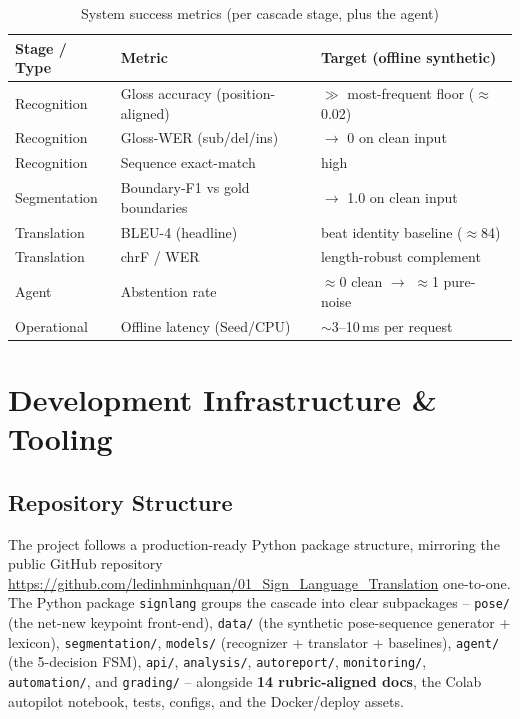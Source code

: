 \documentclass[12pt,a4paper]{article}
\begin{document}
\begin{table}[H]
\centering
\caption{System success metrics (per cascade stage, plus the agent)}
\begin{tabular}{lll}
\toprule
\textbf{Stage / Type} & \textbf{Metric} & \textbf{Target (offline synthetic)} \\
\midrule
Recognition & Gloss accuracy (position-aligned) & $\gg$ most-frequent floor ($\approx$0.02) \\
Recognition & Gloss-WER (sub/del/ins) & $\rightarrow$ 0 on clean input \\
Recognition & Sequence exact-match & high \\
Segmentation & Boundary-F1 vs gold boundaries & $\rightarrow$ 1.0 on clean input \\
Translation & BLEU-4 (headline) & beat identity baseline ($\approx$84) \\
Translation & chrF / WER & length-robust complement \\
Agent & Abstention rate & $\approx$0 clean $\rightarrow$ $\approx$1 pure-noise \\
Operational & Offline latency (Seed/CPU) & $\sim$3--10\,ms per request \\
\bottomrule
\end{tabular}
\end{table}

\section{Development Infrastructure \& Tooling}

\subsection{Repository Structure}

The project follows a production-ready Python package structure, mirroring the public GitHub repository \url{https://github.com/ledinhminhquan/01_Sign_Language_Translation} one-to-one. The Python package \texttt{signlang} groups the cascade into clear subpackages -- \texttt{pose/} (the net-new keypoint front-end), \texttt{data/} (the synthetic pose-sequence generator + lexicon), \texttt{segmentation/}, \texttt{models/} (recognizer + translator + baselines), \texttt{agent/} (the 5-decision FSM), \texttt{api/}, \texttt{analysis/}, \texttt{autoreport/}, \texttt{monitoring/}, \texttt{automation/}, and \texttt{grading/} -- alongside \textbf{14 rubric-aligned docs}, the Colab autopilot notebook, tests, configs, and the Docker/deploy assets.
\end{document}
